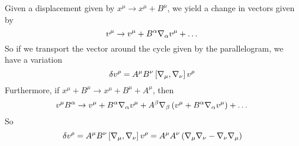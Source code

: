 \documentclass{article}
\begin{document}
 		\begin{figure}[h]
 		\end{figure}
 	
 		Given a displacement given by $x^\mu \to x^\mu + B^\mu$, we yield a change in vectors given by
 		\begin{equation}
 			\label{eq:VectorChange}
 			v^\mu \to v^\mu + B^\alpha \nabla_\alpha v^\mu + \dots
 		\end{equation}
 		So if we transport the vector around the cycle given by the parallelogram, we have a variation
 		\begin{equation}
 			\label{eq:VectorVariation}
 			\delta v^\rho = A^\mu B^\nu \left[ \nabla_\mu, \nabla_\nu \right] v^\rho 
 		\end{equation}
 		Furthermore, if $x^\mu + B^\mu \to x^\mu + B^\mu + A^\mu$, then
 		\begin{equation}
 			\label{eq:VectorChange2}
 			v^\mu  B^\alpha \to v^\mu + B^\alpha \nabla_\alpha v^\mu + A^\beta \nabla_\beta \left( v^\mu + B^\alpha \nabla_\alpha v^\mu \right) + \dots 
 		\end{equation}
 		So
 		\begin{equation}
 			\label{eq:VectorVariation2}
 			\delta v^\rho = A^\mu B^\nu \left[ \nabla_\mu, \nabla_\nu \right] v^\rho  = A^\mu A^\nu \left( \nabla_\mu 
 			\nabla_\nu - \nabla_\nu \nabla_\mu \right)
 		\end{equation}
 		
\end{document}
